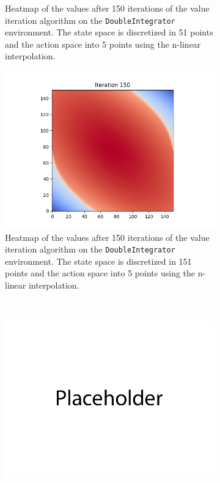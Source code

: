 \documentclass{article}
\begin{document}
\begin{enumerate}[(a)]
\begin{figure}[h!]
\begin{subfigure}{0.3\textwidth}
        \caption{Heatmap of the values after 150 iterations of the value iteration algorithm on the \texttt{DoubleIntegrator} environment. 
                The state space is discretized in 51 points and the action space into 5 points using the n-linear interpolation.}
    \end{subfigure}
    \hspace{0.1 in}
    \begin{subfigure}{0.3\textwidth}
        \centering
        \includegraphics[width=\textwidth]{figures/part_2_b_c.png}
        \caption{Heatmap of the values after 150 iterations of the value iteration algorithm on the \texttt{DoubleIntegrator} environment. 
                The state space is discretized in 151 points and the action space into 5 points using the n-linear interpolation.}
    \end{subfigure}
    \\
    \centering
    \begin{subfigure}{0.3\textwidth}
        \centering
        \includegraphics[width=\textwidth]{figures/placeholder.png}

\end{subfigure}
\end{figure}
\end{enumerate}
\end{document}
